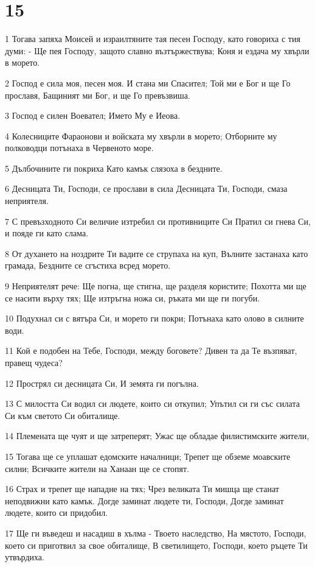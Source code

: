 \chapter{15}

\par 1 Тогава запяха Моисей и израилтяните тая песен Господу, като говориха с тия думи: - Ще пея Господу, защото славно възтържествува; Коня и ездача му хвърли в морето.
\par 2 Господ е сила моя, песен моя. И стана ми Спасител; Той ми е Бог и ще Го прославя, Бащиният ми Бог, и ще Го превъзвиша.
\par 3 Господ е силен Воевател; Името Му е Иеова.
\par 4 Колесниците Фараонови и войската му хвърли в морето; Отборните му полководци потънаха в Червеното море.
\par 5 Дълбочините ги покриха Като камък слязоха в бездните.
\par 6 Десницата Ти, Господи, се прослави в сила Десницата Ти, Господи, смаза неприятеля.
\par 7 С превъзходното Си величие изтребил си противниците Си Пратил си гнева Си, и пояде ги като слама.
\par 8 От духането на ноздрите Ти вадите се струпаха на куп, Вълните застанаха като грамада, Бездните се сгъстиха всред морето.
\par 9 Неприятелят рече: Ще погна, ще стигна, ще разделя користите; Похотта ми ще се насити върху тях; Ще изтръгна ножа си, ръката ми ще ги погуби.
\par 10 Подухнал си с вятъра Си, и морето ги покри; Потънаха като олово в силните води.
\par 11 Кой е подобен на Тебе, Господи, между боговете? Дивен та да Те възпяват, правещ чудеса?
\par 12 Прострял си десницата Си, И земята ги погълна.
\par 13 С милостта Си водил си людете, които си откупил; Упътил си ги със силата Си към светото Си обиталище.
\par 14 Племената ще чуят и ще затреперят; Ужас ще обладае филистимските жители,
\par 15 Тогава ще се уплашат едомските началници; Трепет ще обземе моавските силни; Всичките жители на Ханаан ще се стопят.
\par 16 Страх и трепет ще нападне на тях; Чрез великата Ти мишца ще станат неподвижни като камък. Догде заминат людете ти, Господи, Догде заминат людете, които си придобил.
\par 17 Ще ги въведеш и насадиш в хълма - Твоето наследство, На мястото, Господи, което си приготвил за свое обиталище, В светилището, Господи, което ръцете Ти утвърдиха.
